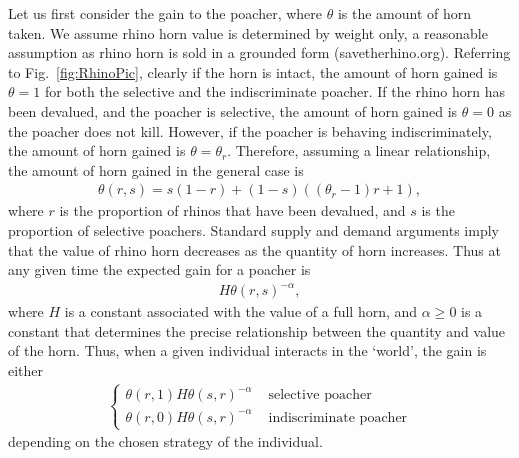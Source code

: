 \documentclass[10pt]{article}
\begin{document}
Let us first consider the gain to the poacher, where $\theta$ is the amount of horn taken. We assume rhino horn value is determined by weight only, a reasonable assumption as rhino horn is sold in a grounded form (savetherhino.org). Referring to Fig.~\ref{fig:RhinoPic}, clearly if the horn is intact, the amount of horn gained is $\theta=1$ for both the selective and the indiscriminate poacher. If the rhino horn has been devalued, and the poacher is selective, the amount of horn gained is $\theta=0$ as the poacher does not kill. However, if the poacher is behaving indiscriminately, the amount of horn gained is $\theta = \theta_r$. Therefore, assuming a linear relationship, the amount of horn gained in the general case is 
\begin{eqnarray}
\label{eqn:theta}
\theta(r,s) = s(1-r) + (1-s)((\theta_r -1)r + 1),
\end{eqnarray}
where $r$ is the proportion of rhinos that have been devalued, and $s$ is the proportion of selective poachers. Standard supply and demand arguments imply that the value of rhino horn decreases as the quantity of horn increases. Thus at any given time the expected gain for a poacher is 
\begin{eqnarray}
\label{eqn:world_gain}
H \theta(r,s)^{-\alpha},
\end{eqnarray}
where $H$ is a constant associated with the value of a full horn, and $ \alpha \geq 0$ is a constant that determines the precise relationship between the quantity and value of the horn. Thus, when a given individual interacts in the `world', the gain is either 
\begin{eqnarray}
\label{eqn:gain}
\left\{
\begin{array}{cl}
\theta(r,1) H \theta(s,r)^{-\alpha} & \mbox{ selective poacher}
\\
\theta(r,0) H \theta(s,r)^{-\alpha} & \mbox{ indiscriminate poacher}
\end{array} \right.
\end{eqnarray}
depending on the chosen strategy of the individual. 
\end{document}
